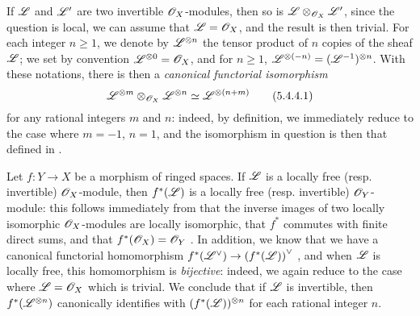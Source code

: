 \begin{env}[5.4.4]
\label{0.5.4.4}
If $\mathscr{L}$ and $\mathscr{L}'$ are two invertible $\mathscr{O}_X$-modules, then so is $\mathscr{L}\otimes_{\mathscr{O}_X}\mathscr{L}'$, since the question is local, we can assume that $\mathscr{L}=\mathscr{O}_X$, and the result is then trivial.
For each integer $n\geq 1$, we denote by $\mathscr{L}^{\otimes n}$ the tensor product of $n$ copies of the sheaf
$\mathscr{L}$; we set by convention $\mathscr{L}^{\otimes 0}=\mathscr{O}_X$, and for $n\geq 1$, $\mathscr{L}^{\otimes(-n)}=(\mathscr{L}^{-1})^{\otimes n}$.
With these notations, there is then a \emph{canonical functorial isomorphism}
\[
  \mathscr{L}^{\otimes m}\otimes_{\mathscr{O}_X}\mathscr{L}^{\otimes n}\simeq\mathscr{L}^{\otimes(n+m)}
  \tag{5.4.4.1}
\]
for any rational integers $m$ and $n$:
indeed, by definition, we immediately reduce to the case where $m=-1$, $n=1$, and the isomorphism in question is then that defined in .
\end{env}

\begin{env}[5.4.5]
\label{0.5.4.5}
Let $f:Y\to X$ be a morphism of ringed spaces.
If $\mathscr{L}$ is a locally free (resp. invertible) $\mathscr{O}_X$-module, then $f^*(\mathscr{L})$ is a locally free (resp. invertible) $\mathscr{O}_Y$-module:
this follows immediately from that the inverse images of two locally isomorphic $\mathscr{O}_X$-modules are locally isomorphic, that $f^*$ commutes with finite direct sums, and that $f^*(\mathscr{O}_X)=\mathscr{O}_Y$ .
In addition, we know that we have a canonical functorial homomorphism $f^*(\dual{\sh{L}})\to\dual{(f^*(\sh{L}))}$ , and when $\mathscr{L}$ is locally free, this homomorphism is \emph{bijective}:
indeed, we again reduce to the case where $\mathscr{L}=\mathscr{O}_X$ which is trivial.
We conclude that if $\mathscr{L}$ is invertible, then $f^*(\mathscr{L}^{\otimes n})$ canonically identifies with $(f^*(\mathscr{L}))^{\otimes n}$ for each rational integer $n$.
\end{env}


